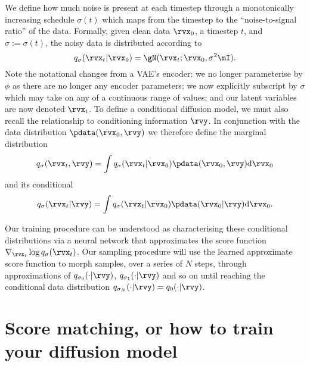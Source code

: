 We define how much noise is present at each timestep through a monotonically increasing schedule $\sigma(t)$ which maps from the timestep to the ``noise-to-signal ratio'' of the data. Formally, given clean data $\rvx_0$, a timestep $t$, and $\sigma := \sigma(t)$, the noisy data is distributed according to
\begin{equation} \label{eq:diffusion-xt-given-x0}
    q_\sigma(\rvx_t|\rvx_0) = \gN ( \rvx_t ; \rvx_0, \sigma^2 \mI ).
\end{equation}
Note the notational changes from a VAE's encoder: we no longer parameterise by $\phi$ as there are no longer any encoder parameters; we now explicitly subscript by $\sigma$ which may take on any of a continuous range of values; and our latent variables are now denoted $\rvx_t$. To define a conditional diffusion model, we must also recall the relationship to conditioning information $\rvy$. In conjunction with the data distribution $\pdata(\rvx_0, \rvy)$ we therefore define the marginal distribution
\begin{equation}
    q_\sigma(\rvx_t,\rvy) = \int q_\sigma(\rvx_t|\rvx_0) \pdata(\rvx_0, \rvy) \mathrm{d} \rvx_0
\end{equation}
and its conditional
\begin{equation}
    q_\sigma(\rvx_t|\rvy) = \int q_\sigma(\rvx_t|\rvx_0) \pdata(\rvx_0|\rvy) \mathrm{d} \rvx_0.
\end{equation}

Our training procedure can be understood as characterising these conditional distributions via a neural network that approximates the score function $\nabla_{\rvx_t} \log q_\sigma(\rvx_t)$. Our sampling procedure will use the learned approximate score function to morph samples, over a series of $N$ steps, through approximations of $q_{\sigma_0}(\cdot | \rvy)$, $q_{\sigma_1}(\cdot | \rvy)$ and so on until reaching the conditional data distribution $q_{\sigma_N}(\cdot | \rvy) = q_{0}(\cdot | \rvy)$. 



\section{Score matching, or how to train your diffusion model}

